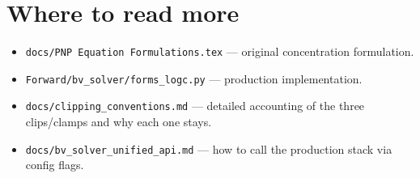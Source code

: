 \documentclass[11pt]{article}
\begin{document}
\section{Where to read more}
\begin{itemize}
  \item \texttt{docs/PNP Equation Formulations.tex} --- original
        concentration formulation.
  \item \texttt{Forward/bv\_solver/forms\_logc.py} --- production
        implementation.
  \item \texttt{docs/clipping\_conventions.md} --- detailed accounting of
        the three clips/clamps and why each one stays.
  \item \texttt{docs/bv\_solver\_unified\_api.md} --- how to call the
        production stack via config flags.
\end{itemize}
\end{document}
